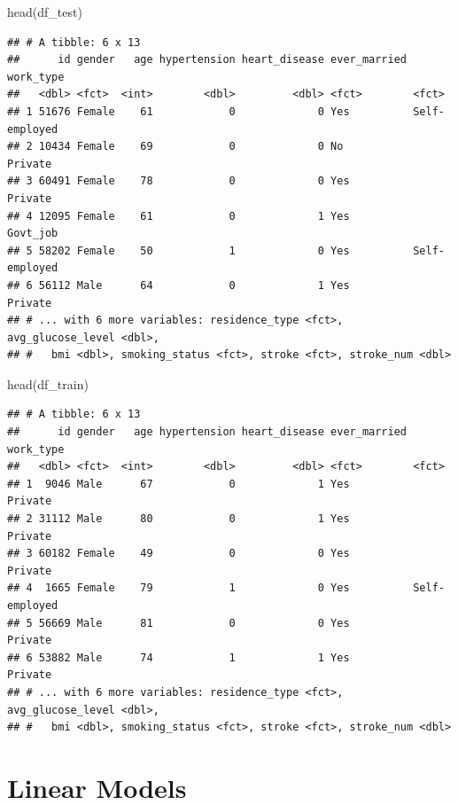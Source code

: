 \documentclass[
]{article}
\newenvironment{Shaded}{\begin{snugshade}}{\end{snugshade}}
\newcommand{\FunctionTok}[1]{\textcolor[rgb]{0.00,0.00,0.00}{#1}}
\newcommand{\NormalTok}[1]{#1}
\renewcommand{\=}[1]{\stackrel{#1}{=}}
\theoremstyle{definition}
\theoremstyle{remark}
\begin{document}
\begin{Shaded}
\begin{Highlighting}[]
\FunctionTok{head}\NormalTok{(df\_test)}
\end{Highlighting}
\end{Shaded}

\begin{verbatim}
## # A tibble: 6 x 13
##      id gender   age hypertension heart_disease ever_married work_type    
##   <dbl> <fct>  <int>        <dbl>         <dbl> <fct>        <fct>        
## 1 51676 Female    61            0             0 Yes          Self-employed
## 2 10434 Female    69            0             0 No           Private      
## 3 60491 Female    78            0             0 Yes          Private      
## 4 12095 Female    61            0             1 Yes          Govt_job     
## 5 58202 Female    50            1             0 Yes          Self-employed
## 6 56112 Male      64            0             1 Yes          Private      
## # ... with 6 more variables: residence_type <fct>, avg_glucose_level <dbl>,
## #   bmi <dbl>, smoking_status <fct>, stroke <fct>, stroke_num <dbl>
\end{verbatim}

\begin{Shaded}
\begin{Highlighting}[]
\FunctionTok{head}\NormalTok{(df\_train)}
\end{Highlighting}
\end{Shaded}

\begin{verbatim}
## # A tibble: 6 x 13
##      id gender   age hypertension heart_disease ever_married work_type    
##   <dbl> <fct>  <int>        <dbl>         <dbl> <fct>        <fct>        
## 1  9046 Male      67            0             1 Yes          Private      
## 2 31112 Male      80            0             1 Yes          Private      
## 3 60182 Female    49            0             0 Yes          Private      
## 4  1665 Female    79            1             0 Yes          Self-employed
## 5 56669 Male      81            0             0 Yes          Private      
## 6 53882 Male      74            1             1 Yes          Private      
## # ... with 6 more variables: residence_type <fct>, avg_glucose_level <dbl>,
## #   bmi <dbl>, smoking_status <fct>, stroke <fct>, stroke_num <dbl>
\end{verbatim}

\hypertarget{linear-models}{%
\section{Linear Models}\label{linear-models}}
\end{document}
